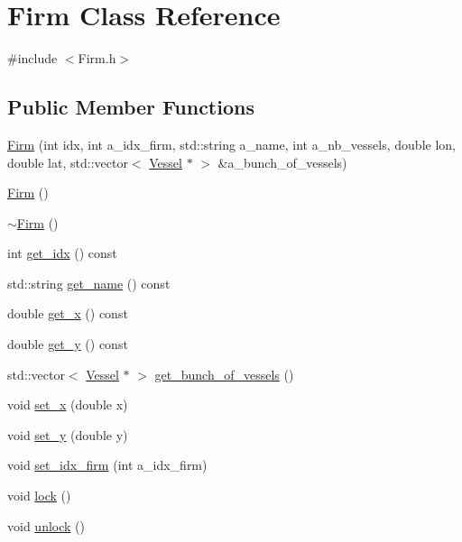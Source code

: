\hypertarget{class_firm}{}\section{Firm Class Reference}
\label{class_firm}


{\ttfamily \#include $<$Firm.\+h$>$}

\subsection*{Public Member Functions}
\begin{DoxyCompactItemize}
\item 
\mbox{\hyperlink{class_firm_acca90c8d721fe1b1b52a5004452a86e3}{Firm}} (int idx, int a\+\_\+idx\+\_\+firm, std\+::string a\+\_\+name, int a\+\_\+nb\+\_\+vessels, double lon, double lat, std\+::vector$<$ \mbox{\hyperlink{class_vessel}{Vessel}} $\ast$ $>$ \&a\+\_\+bunch\+\_\+of\+\_\+vessels)
\item 
\mbox{\hyperlink{class_firm_a06e2aafef1de84e86cec448f162a8e95}{Firm}} ()
\item 
\mbox{\hyperlink{class_firm_a7712fa88930763e92cfeb50ba181a306}{$\sim$\+Firm}} ()
\item 
int \mbox{\hyperlink{class_firm_afaaaf278dabb1d2fd50663cc80982946}{get\+\_\+idx}} () const
\item 
std\+::string \mbox{\hyperlink{class_firm_a829fbfe777b4cc270da507fbb1121558}{get\+\_\+name}} () const
\item 
double \mbox{\hyperlink{class_firm_ab822c50adfd1d46136a100734348e4a5}{get\+\_\+x}} () const
\item 
double \mbox{\hyperlink{class_firm_a06194bc4ad64e00520e6ff0ee572d782}{get\+\_\+y}} () const
\item 
std\+::vector$<$ \mbox{\hyperlink{class_vessel}{Vessel}} $\ast$ $>$ \mbox{\hyperlink{class_firm_ac8e5b174a55873c9ea206ce6ebcacf42}{get\+\_\+bunch\+\_\+of\+\_\+vessels}} ()
\item 
void \mbox{\hyperlink{class_firm_aa8244e54ed25b6518401b4bf7c3c96ca}{set\+\_\+x}} (double x)
\item 
void \mbox{\hyperlink{class_firm_af1b38a4dad355a4e88deaff00f61e0b3}{set\+\_\+y}} (double y)
\item 
void \mbox{\hyperlink{class_firm_a7843435f938d27998bbac944d8063927}{set\+\_\+idx\+\_\+firm}} (int a\+\_\+idx\+\_\+firm)
\item 
void \mbox{\hyperlink{class_firm_a269637146235f9026e0a73a16301824f}{lock}} ()
\item 
void \mbox{\hyperlink{class_firm_a2a2db6e2bf58608ce874af2472050e9f}{unlock}} ()
\end{DoxyCompactItemize}
